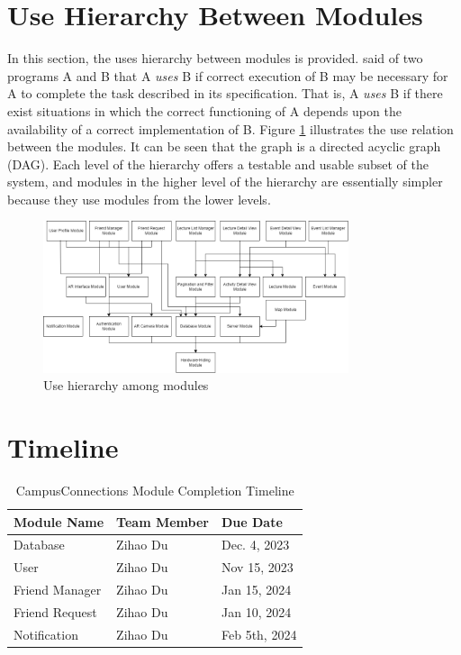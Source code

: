 \documentclass[12pt, titlepage]{article}
\begin{document}
\section{Use Hierarchy Between Modules} \label{SecUse}

In this section, the uses hierarchy between modules is
provided. \citet{Parnas1978} said of two programs A and B that A {\em uses} B if
correct execution of B may be necessary for A to complete the task described in
its specification. That is, A {\em uses} B if there exist situations in which
the correct functioning of A depends upon the availability of a correct
implementation of B.  Figure \ref{FigUH} illustrates the use relation between
the modules. It can be seen that the graph is a directed acyclic graph
(DAG). Each level of the hierarchy offers a testable and usable subset of the
system, and modules in the higher level of the hierarchy are essentially simpler
because they use modules from the lower levels.

\begin{figure}[H]
\centering
\includegraphics[width=0.8\textwidth]{UsesHierarchy.png}
\caption{Use hierarchy among modules}
\label{FigUH}
\end{figure}

\section{Timeline}
\begin{table}[H]
\centering
\begin{tabular}{p{} p{}  p{}}
\toprule
Module Name & Team Member & Due Date \\
\midrule
Database & Zihao Du & Dec. 4, 2023\\
User & Zihao Du & Nov 15, 2023\\
Friend Manager & Zihao Du & Jan 15, 2024\\
Friend Request & Zihao Du & Jan 10, 2024\\
Notification & Zihao Du & Feb 5th, 2024\\
\bottomrule
\end{tabular}
\caption{CampusConnections Module Completion Timeline}
\end{table}
\end{document}

